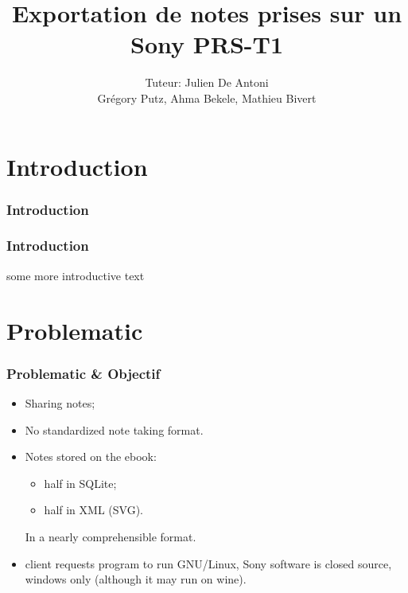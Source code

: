 \documentclass[t,12pt]{beamer}
\title{Exportation de notes prises sur un Sony PRS-T1}
\author{Tuteur: Julien De Antoni\\Grégory Putz, Ahma Bekele, Mathieu Bivert}
\date{\oldstylenums{Juin 2012}}
\begin{document}
\frame{\titlepage}

\section{Introduction}
\begin{frame}
  \frametitle{Introduction}
  \centering
  \tableofcontents
\end{frame}

\begin{frame}
  \frametitle{Introduction}
  some more introductive text
\end{frame}



\section{Problematic}
\begin{frame}
  \frametitle{Problematic \& Objectif}
  \begin{itemize}
  \pause \item Sharing notes;
  \pause \item No standardized note taking format.
  \pause \item Notes stored  on the ebook:
    \begin{itemize}
      \item half in SQLite;
      \item half in XML (SVG).
    \end{itemize}
  \pause In a nearly comprehensible format.
  \pause \item client requests program to run GNU/Linux,
  \pause Sony software is closed source, windows only (although
  it may run on wine).
  \end{itemize}
\end{frame}
\end{document}
